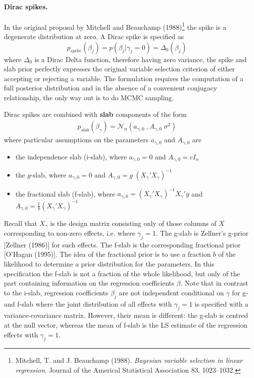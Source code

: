\documentclass[11 pt]{article}
\begin{document}
\begin{multicols}{2}
\paragraph{Dirac spikes.}  In the original proposal by Mitchell and Beauchamp (1988)\footnote{Mitchell, T. and J. Beauchamp (1988). \textit{Bayesian variable selection in linear regression}. Journal of the Americal Statistical Association 83, 1023–1032.} the spike is a degenerate distribution at zero. A Dirac spike is specified as $$p_{spike}(\beta_j) = p(\beta_j|\gamma_j=0) = \Delta_0(\beta_j)$$ where $\Delta_0$ is a Dirac Delta function, therefore having zero variance, the spike and slab prior perfectly expresses the original variable selection criterion of either accepting or rejecting a variable. The formulation requires the computation of a full posterior distribution and in the absence of a convenient conjugacy relationship, the only way out is to do MCMC sampling.

Dirac spikes are combined with \textbf{slab} components of the form
\begin{align*}
    p_{slab}(\beta_\gamma) = \mathcal{N}_n(a_{\gamma,0}\;,A_{\gamma,0}\; \sigma^2)
\end{align*}
where particular assumptions on the parameters $a_{\gamma,0}$ and $A_{\gamma,0}$ are
\begin{itemize}
    \item the independence slab (i-slab), where $a_{\gamma,0} = 0$ and $A_{\gamma,0} = c I_n$
    \item the $g$-slab, where $a_{\gamma,0} = 0$ and $A_{\gamma,0} = g\;(X_\gamma'X_\gamma)^{-1}$
    \item the fractional slab (f-slab), where $a_{\gamma,0} = (X_\gamma'X_\gamma)^{-1}X_\gamma'y$ and $A_{\gamma,0} = \frac{1}{b}(X_\gamma'X_\gamma)^{-1}$
\end{itemize}
Recall that $X_\gamma$ is the design matrix consisting only of those columns of $X$ corresponding to non-zero effects, i.e. where $\gamma_j =1$. The g-slab is Zellner’s g-prior [Zellner (1986)] for such effects. The f-slab is the corresponding fractional prior [O’Hagan (1995)]. The idea of the fractional prior is to use a fraction $b$ of the likelihood to determine a prior distribution for the parameters. In this specification the f-slab is not a fraction of the whole likelihood, but only of the part containing information on the regression coefficients $\beta$. Note that in contrast to the i-slab, regression coefficients $\beta_j$ are not independent conditional on $\gamma$ for g- and f-slab where the joint distribution of all effects with
$\gamma_j=1$ is specified with a variance-covariance matrix.
However, their mean is different: the g-slab is centred at the null vector, whereas the mean of f-slab is the LS estimate of the regression effects with $\gamma_j = 1$.




\end{multicols}
\end{document}
